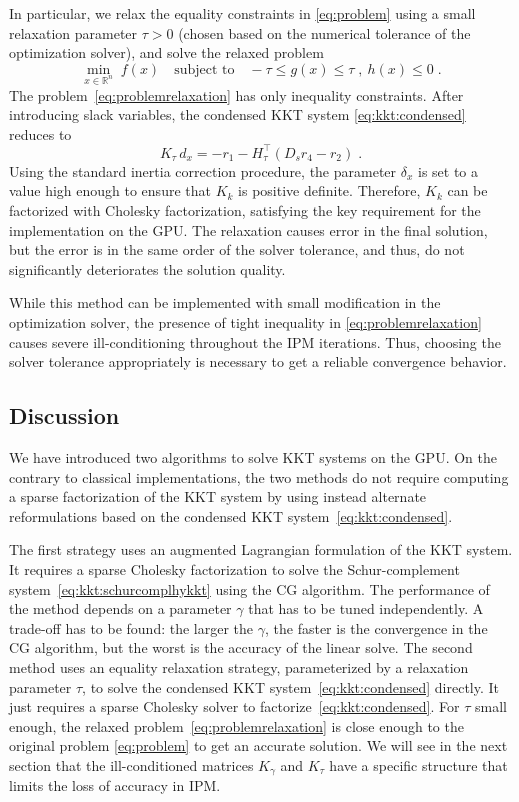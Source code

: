 In particular, we relax the equality constraints in \eqref{eq:problem} using a small relaxation parameter $\tau > 0$ (chosen based on the numerical tolerance of the optimization solver), and solve the relaxed problem
\begin{equation}
  \label{eq:problemrelaxation}
    \min_{x \in \mathbb{R}^n} \;  f(x)
\quad \text{subject to}\quad
     - \tau \leq g(x) \leq \tau \;,~  h(x) \leq 0  \; .
\end{equation}
The problem~\eqref{eq:problemrelaxation} has only inequality constraints. After introducing slack variables, the condensed KKT system
\eqref{eq:kkt:condensed} reduces to
\begin{equation}
  \label{eq:liftedkkt}
    K_\tau \,d_x = - r_1 - H_\tau^\top(D_s r_4 - r_2) \; .
\end{equation}
Using the standard inertia correction procedure, the parameter $\delta_x$ is set to a value high enough to ensure that  $K_k$ is positive definite. Therefore, $K_k$ can be factorized with Cholesky factorization, satisfying the key requirement for the implementation on the GPU. The relaxation causes error in the final solution, but the error is in the same order of the solver tolerance, and thus, do not significantly deteriorates the solution quality.

While this method can be implemented with small modification in the optimization solver, the presence of tight inequality in \eqref{eq:problemrelaxation} causes severe ill-conditioning throughout the IPM iterations. Thus,
choosing the solver tolerance appropriately is necessary to get a reliable convergence behavior.


\subsection{Discussion}
We have introduced two algorithms to solve
KKT systems on the GPU. On the contrary to classical implementations,
the two methods do not require computing a sparse \lblt factorization of the KKT
system by using instead alternate reformulations based on the condensed KKT
system~\eqref{eq:kkt:condensed}.

The first strategy uses an augmented Lagrangian formulation
of the KKT system. It requires a sparse Cholesky factorization
to solve the Schur-complement system~\eqref{eq:kkt:schurcomplhykkt}
using the CG algorithm. The performance of the method depends on a parameter $\gamma$ that
has to be tuned independently. A trade-off has to be found: the larger the $\gamma$, the faster is the convergence
in the CG algorithm, but the worst is the accuracy of the linear solve.
The second method uses an equality relaxation strategy, parameterized
by a relaxation parameter $\tau$, to solve the condensed KKT system~\eqref{eq:kkt:condensed} directly.
It just requires a sparse Cholesky solver to factorize~\eqref{eq:kkt:condensed}. For $\tau$
small enough, the relaxed problem~\eqref{eq:problemrelaxation} is close enough to the original
problem \eqref{eq:problem} to get an accurate solution.
We will see in the next section that the ill-conditioned matrices $K_\gamma$ and $K_\tau$
have a specific structure that limits the loss of accuracy in IPM.


